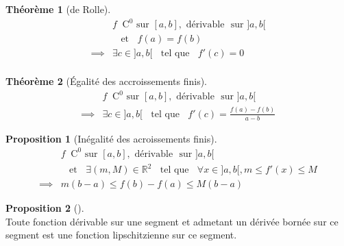 \documentclass{article}
\newcommand{\R}{\mathbb{R}}
\newcommand{\et}{\;\;\text{ et }\;\;}
\newcommand{\tq}{\;\;\text{ tel que }\;\;}
\newcommand{\co}[1]{\mathrm{C^{#1}}}
\newcommand{\sur}{\text{ sur }}
\newcommand{\drv}{\text{ dérivable }}
\newcommand{\e}{\!\!}
\theoremstyle{definition}
\newtheorem*{prop}{Proposition}
\theoremstyle{remark}
\theoremstyle{plain}
\newtheorem*{them}{Théorème}
\newenvironment{prp}[1][]
{\begin{prop}[#1]\quad\\}
{\end{prop}}
\newenvironment{thm}[1][]
{\begin{them}[#1]\quad\\}
{\end{them}}
\begin{document}
\begin{thm}[de Rolle]
\begin{align*}
            &f \;\; \co{0} \sur {[a, b]}, \drv \e \sur {]a, b[} \\
            &\et f(a) = f(b) \\
\implies    &\exists c \in {]a, b[} \tq f'(c) = 0 \\
\end{align*}
\end{thm}

\begin{thm}[\'Egalité des accroissements finis]
\begin{align*}
            &f \;\; \co{0} \sur {[a, b]}, \drv \e \sur {]a, b[} \\
\implies    &\exists c \in {]a, b[}
                \tq f'(c) = \frac{f(a) - f(b)}{a - b}
\end{align*}
\end{thm}

\begin{prp}[Inégalité des acroissements finis]
\begin{align*}
            &f \;\; \co{0} \sur {[a, b]}, \drv \e \sur {]a, b[} \\
            &\et \exists (m, M) \in \R^2 \tq \forall x \in {]a, b[},
                m \leq f'(x) \leq M \\
\implies    &m(b - a) \leq f(b) - f(a) \leq M(b - a)
\end{align*}
\end{prp}

\begin{prp}
Toute fonction dérivable sur une segment et admetant un dérivée bornée
sur ce segment est une fonction lipschitzienne sur ce segment.
\end{prp}
\end{document}
